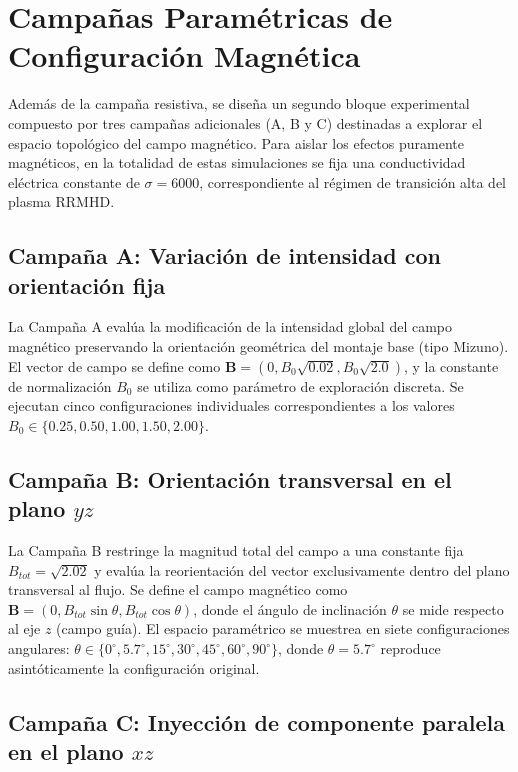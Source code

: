 \section{Campañas Paramétricas de Configuración Magnética}

\primerparrafo Además de la campaña resistiva, se diseña un segundo bloque experimental compuesto por tres campañas adicionales (A, B y C) destinadas a explorar el espacio topológico del campo magnético. Para aislar los efectos puramente magnéticos, en la totalidad de estas simulaciones se fija una conductividad eléctrica constante de $\sigma = 6000$, correspondiente al régimen de transición alta del plasma RRMHD.

\subsection{Campaña A: Variación de intensidad con orientación fija}

\primerparrafo La Campaña A evalúa la modificación de la intensidad global del campo magnético preservando la orientación geométrica del montaje base (tipo Mizuno). El vector de campo se define como $\mathbf{B} = (0, B_0\sqrt{0.02}, B_0\sqrt{2.0})$, y la constante de normalización $B_0$ se utiliza como parámetro de exploración discreta. Se ejecutan cinco configuraciones individuales correspondientes a los valores $B_0 \in \{0.25, 0.50, 1.00, 1.50, 2.00\}$.

\subsection{Campaña B: Orientación transversal en el plano $yz$}

\primerparrafo La Campaña B restringe la magnitud total del campo a una constante fija $B_{tot} = \sqrt{2.02}$ y evalúa la reorientación del vector exclusivamente dentro del plano transversal al flujo. Se define el campo magnético como $\mathbf{B} = (0, B_{tot}\sin\theta, B_{tot}\cos\theta)$, donde el ángulo de inclinación $\theta$ se mide respecto al eje $z$ (campo guía). El espacio paramétrico se muestrea en siete configuraciones angulares: $\theta \in \{0^\circ, 5.7^\circ, 15^\circ, 30^\circ, 45^\circ, 60^\circ, 90^\circ\}$, donde $\theta = 5.7^\circ$ reproduce asintóticamente la configuración original.

\subsection{Campaña C: Inyección de componente paralela en el plano $xz$}

